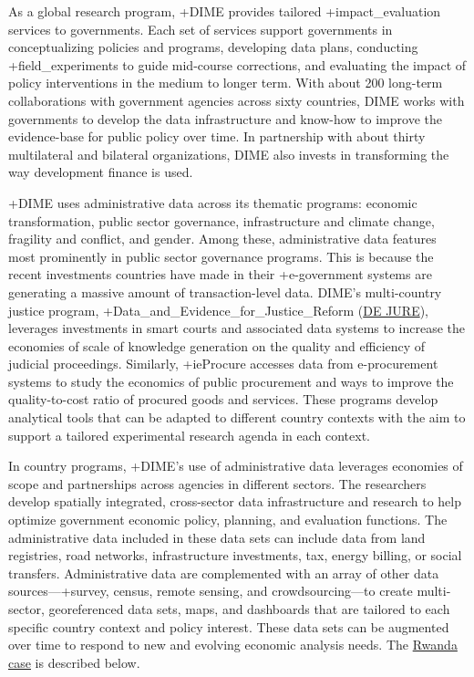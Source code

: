 \documentclass[
]{WileySix}
\begin{document}
As a global research program, +DIME\textbar{} provides tailored +impact\_evaluation\textbar{} services to governments. Each set of services support governments in conceptualizing policies and programs, developing data plans, conducting +field\_experiments\textbar{} to guide mid-course corrections, and evaluating the impact of policy interventions in the medium to longer term. With about 200 long-term collaborations with government agencies across sixty countries, DIME works with governments to develop the data infrastructure and know-how to improve the evidence-base for public policy over time. In partnership with about thirty multilateral and bilateral organizations, DIME also invests in transforming the way development finance is used.

+DIME\textbar{} uses administrative data across its thematic programs: economic transformation, public sector governance, infrastructure and climate change, fragility and conflict, and gender. Among these, administrative data features most prominently in public sector governance programs. This is because the recent investments countries have made in their +e-government\textbar{} systems are generating a massive amount of transaction-level data. DIME's multi-country justice program, +Data\_and\_Evidence\_for\_Justice\_Reform\textbar{} (\href{http://pubdocs.worldbank.org/en/923891592406548876/DE-JURE-Brief.pdf}{DE JURE}), leverages investments in smart courts and associated data systems to increase the economies of scale of knowledge generation on the quality and efficiency of judicial proceedings. Similarly, +ieProcure\textbar{} accesses data from e-procurement systems to study the economics of public procurement and ways to improve the quality-to-cost ratio of procured goods and services. These programs develop analytical tools that can be adapted to different country contexts with the aim to support a tailored experimental research agenda in each context.

In country programs, +DIME\textbar's use of administrative data leverages economies of scope and partnerships across agencies in different sectors. The researchers develop spatially integrated, cross-sector data infrastructure and research to help optimize government economic policy, planning, and evaluation functions. The administrative data included in these data sets can include data from land registries, road networks, infrastructure investments, tax, energy billing, or social transfers. Administrative data are complemented with an array of other data sources---+survey\textbar, census, remote sensing, and crowdsourcing---to create multi-sector, georeferenced data sets, maps, and dashboards that are tailored to each specific country context and policy interest. These data sets can be augmented over time to respond to new and evolving economic analysis needs. The \href{http://pubdocs.worldbank.org/en/703511592406882534/Rwanda-Program-Brief.pdf}{Rwanda case} is described below.
\end{document}

